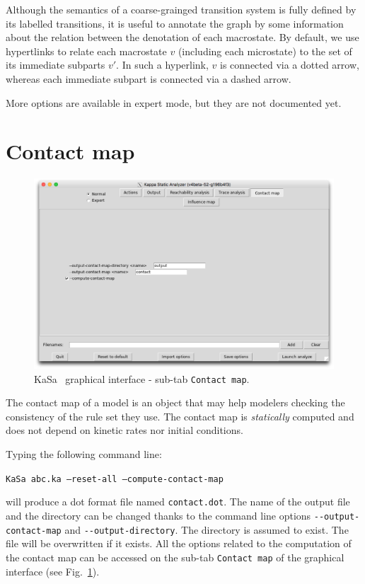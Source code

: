\documentclass[11pt]{book}
\def\KaSa{\textsf{KaSa}}
\begin{document}
Although the semantics of a coarse-grainged transition system is fully defined  by its labelled transitions, it is useful to annotate the graph by some information about the relation between the denotation of each macrostate. By default, we use hypertlinks to relate each macrostate $v$ (including each microstate)
 to the set of its immediate subparts $v'$. In such a hyperlink, $v$ is connected via a dotted arrow, whereas each immediate subpart is connected via a dashed arrow.

 More options are available in expert mode, but they are not documented yet.

\section{Contact map}

\begin{figure}[htbp]
\centering
\includegraphics[width=12cm,bb=0 0 1904 1208]{img/kasa_4.png}
\caption{\KaSa~ graphical interface - sub-tab \texttt{Contact map}.}
\label{fig:kasa:4}
\end{figure}

The contact map of a model is an object that may help modelers checking the consistency of the rule set they use. The contact map is \emph{statically} computed and does not depend on kinetic rates nor initial conditions.


Typing the following command line:

\texttt{KaSa abc.ka --reset-all --compute-contact-map}

will produce a dot format file named \texttt{contact.dot}.
The name of the output file and the directory can be changed thanks to the command line options \texttt{-{}-output-contact-map} and \texttt{-{}-output-directory}.
The directory is assumed to exist. The file will be overwritten if it exists. All the options related to the computation of the contact map can be accessed on the
sub-tab \texttt{Contact map} of the graphical interface (see Fig.~\ref{fig:kasa:4}).
\end{document}

